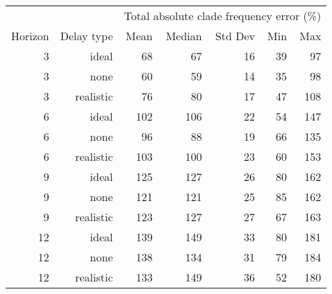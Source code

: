 
\begin{tabular*}{0.7\textwidth}{rrrrrrr}
\toprule
        &            & \multicolumn{5}{c}{Total absolute clade frequency error (\%)} \\
Horizon & Delay type & Mean & Median & Std Dev & Min & Max \\
\midrule

3 & ideal & 68 & 67 & 16 & 39 & 97 \\
3 & none & 60 & 59 & 14 & 35 & 98 \\
3 & realistic & 76 & 80 & 17 & 47 & 108 \\
6 & ideal & 102 & 106 & 22 & 54 & 147 \\
6 & none & 96 & 88 & 19 & 66 & 135 \\
6 & realistic & 103 & 100 & 23 & 60 & 153 \\
9 & ideal & 125 & 127 & 26 & 80 & 162 \\
9 & none & 121 & 121 & 25 & 85 & 162 \\
9 & realistic & 123 & 127 & 27 & 67 & 163 \\
12 & ideal & 139 & 149 & 33 & 80 & 181 \\
12 & none & 138 & 134 & 31 & 79 & 184 \\
12 & realistic & 133 & 149 & 36 & 52 & 180 \\

\bottomrule
\end{tabular*}

